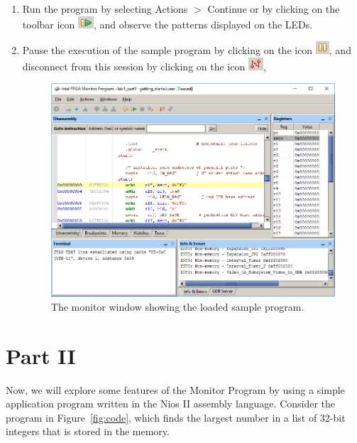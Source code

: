 \documentclass[epsfig,10pt,fullpage]{article}
\begin{document}
\begin{enumerate}
\item Run the program by selecting {\sf Actions $>$ Continue} or
by clicking on the toolbar icon \hbox{\includegraphics[scale=0.8]{figures/icon_continue.png}}, 
and observe the patterns displayed on the LEDs. 

\item Pause the execution of the sample program by clicking on the 
icon \hbox{\includegraphics[scale=0.8]{figures/icon_pause.png}}, 
and disconnect from this session
by clicking on the icon \hbox{\includegraphics[scale=0.8]{figures/icon_disconn.png}}, 

\begin{figure}[H]
	\begin{center}
	\includegraphics[scale=0.58]{figures/figureMP9.png}
	\end{center}
	\caption{The monitor window showing the loaded sample program.}
\label{fig:MP9}
\end{figure}

\end{enumerate}

\clearpage

\section*{Part II}
Now, we will explore some features of the Monitor Program by using a
simple application program written in the Nios II assembly language.
Consider the program in Figure~\ref{fig:code}, which finds the largest number in a list
of 32-bit integers that is stored in the memory.
\end{document}
